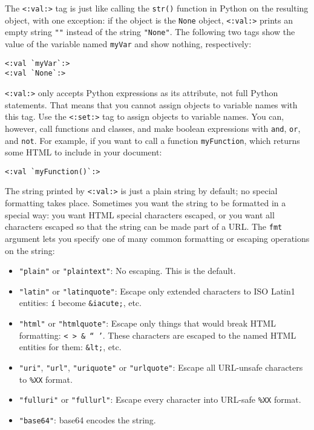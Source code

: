 \documentclass{manual}
\begin{document}
The \texttt{<:val:>} tag is just like calling the \texttt{str()} 
function in Python on the resulting object, with one exception: 
if the object is the \texttt{None} object, \texttt{<:val:>} 
prints an empty string \texttt{""} instead of the string 
\texttt{"None"}. The following two tags show the value of
the variable named \texttt{myVar} and show nothing, respectively:

\begin{verbatim}
<:val `myVar`:>
<:val `None`:>
\end{verbatim}

\texttt{<:val:>} only accepts Python expressions as its attribute, 
not full Python statements. That means that you cannot assign 
objects to variable names with this tag. Use the 
\texttt{<:set:>}  tag to assign 
objects to variable names. You can, however, call functions 
and classes, and make boolean expressions with \texttt{and}, 
\texttt{or}, and \texttt{not}. For example, if you want to call
a function \texttt{myFunction}, which returns some HTML to include
in your document:

\begin{verbatim}
<:val `myFunction()`:>
\end{verbatim}

The string printed by \texttt{<:val:>} is just a plain 
string by default; no special formatting takes place. 
Sometimes you want the string to be formatted in a special way: 
you want HTML special characters escaped, or you want all 
characters escaped so that the string can be made part of a URL. 
The \texttt{fmt} argument lets you specify one of many common 
formatting or escaping operations on the string:

\begin{itemize}
\item \texttt{"plain"} or \texttt{"plaintext"}: 
No escaping. This is the default.

\item 
\texttt{"latin"} or \texttt{"latinquote"}: 
Escape only extended characters to ISO Latin1 
entities: \texttt{\'i} become \texttt{\&iacute;}, etc.


\item 
\texttt{"html"} or \texttt{"htmlquote"}: 
Escape only things that would break HTML 
formatting: \texttt{< > \& `` '}.
These characters are escaped to the named HTML entities
for them: \texttt{\&lt;}, etc.


\item 
\texttt{"uri"}, \texttt{"url"}, \texttt{"uriquote"} 
or \texttt{"urlquote"}: 
Escape all URL-unsafe characters to \texttt{\%XX} format.


\item \texttt{"fulluri"} or \texttt{"fullurl"}: 
Escape every character into URL-safe \texttt{\%XX} format.


\item \texttt{"base64"}: base64 encodes the string.

\end{itemize}
\end{document}
